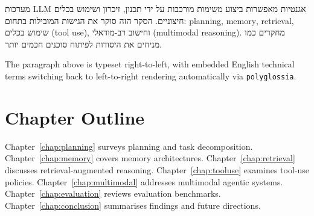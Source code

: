 \medskip
\begin{hebrew}
מערכות \textenglish{LLM} אגנטיות מאפשרות ביצוע משימות מורכבות
על ידי תכנון, זיכרון ושימוש בכלים חיצוניים.
הסקר הזה סוקר את הגישות המובילות בתחום:
\textenglish{planning}, \textenglish{memory}, \textenglish{retrieval},
שימוש בכלים (\textenglish{tool use}), וחישוב רב-מודאלי
(\textenglish{multimodal reasoning}).
מחקרים כמו \textenglish{\cite{wei2026agenticreasoning}}
מניחים את היסודות לפיתוח סוכנים חכמים יותר.
\end{hebrew}
\medskip

The paragraph above is typeset right-to-left, with embedded English
technical terms switching back to left-to-right rendering automatically
via \texttt{polyglossia}.

\section{Chapter Outline}
\label{sec:intro-outline}

Chapter~\ref{chap:planning} surveys planning and task decomposition.
Chapter~\ref{chap:memory} covers memory architectures.
Chapter~\ref{chap:retrieval} discusses retrieval-augmented reasoning.
Chapter~\ref{chap:tooluse} examines tool-use policies.
Chapter~\ref{chap:multimodal} addresses multimodal agentic systems.
Chapter~\ref{chap:evaluation} reviews evaluation benchmarks.
Chapter~\ref{chap:conclusion} summarises findings and future directions.
